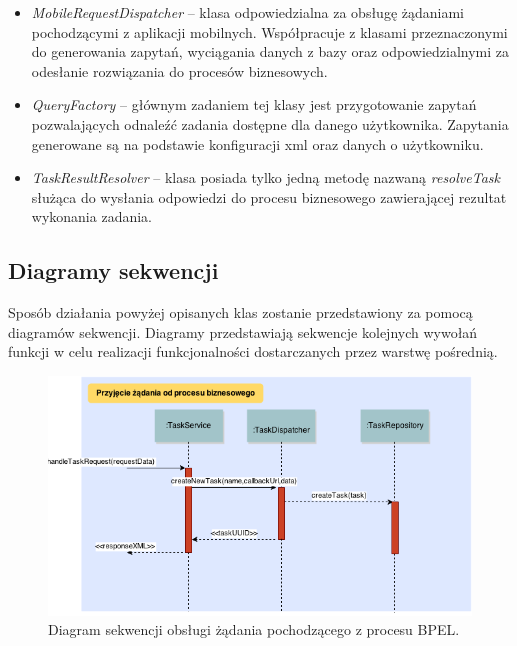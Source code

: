 \begin{itemize}
\item \textit{MobileRequestDispatcher} -- klasa odpowiedzialna za obsługę żądaniami pochodzącymi z aplikacji mobilnych. Współpracuje z klasami przeznaczonymi do generowania zapytań, wyciągania danych z bazy oraz odpowiedzialnymi za odesłanie rozwiązania do procesów biznesowych. 
\item \textit{QueryFactory} -- głównym zadaniem tej klasy jest przygotowanie zapytań pozwalających odnaleźć zadania dostępne dla danego użytkownika. Zapytania generowane są na podstawie konfiguracji xml oraz danych o użytkowniku. 
\item \textit{TaskResultResolver} -- klasa posiada tylko jedną metodę nazwaną \textit{resolveTask} służąca do wysłania odpowiedzi do procesu biznesowego zawierającej rezultat wykonania zadania. 
\end{itemize}

\subsection{Diagramy sekwencji}

Sposób działania powyżej opisanych klas zostanie przedstawiony za pomocą diagramów sekwencji. Diagramy przedstawiają sekwencje kolejnych wywołań funkcji w celu realizacji funkcjonalności dostarczanych przez warstwę pośrednią. 

\begin{figure}[h]
\centerline{\includegraphics[scale=0.6]{createTaskFlow}}
\caption{Diagram sekwencji obsługi żądania pochodzącego z procesu BPEL.}
\label{fig:createTaskFlow}
\end{figure}

